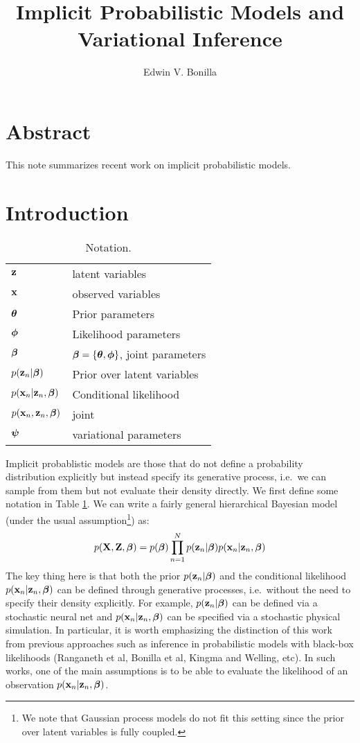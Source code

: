 \documentclass[12pt,a4page]{article}
\title{Implicit Probabilistic Models and Variational Inference}
\author{Edwin V. Bonilla}
\begin{document}
	\maketitle
	\section*{Abstract}
	This note summarizes recent work on implicit probabilistic models. 
	\section{Introduction} 
	\begin{table}[h!]
		\centering
		\caption{Notation. }
		\label{tab-notation}
		\begin{tabular}{ll}
			\toprule
			$\mathbf{z}$ & latent variables\\
			$\mathbf{x}$ & observed variables \\
			$\boldsymbol{ \theta }$ & Prior parameters\\
			$\boldsymbol{ \phi }$ & Likelihood parameters \\
			$\boldsymbol{ \beta }$ & $\boldsymbol{ \beta } = \{ \boldsymbol{ \theta }, \boldsymbol{ \phi }\}$, joint parameters\\
			$p (\mathbf{z}_{n} | \boldsymbol{ \beta })$ & Prior over latent variables \\
			$p(\mathbf{x}_{n} | \mathbf{z}_{n}, \boldsymbol{ \beta })$ & Conditional likelihood \\
			$p(\mathbf{x}_{n}, \mathbf{z}_{n}, \boldsymbol{ \beta })$ & joint \\
			$\boldsymbol{ \psi }$ & variational parameters\\
			\bottomrule 
		\end{tabular}
	\end{table}
		Implicit probablistic models are those that do not define a probability distribution explicitly but instead specify its generative process, i.e.~we can sample from them but not evaluate their density directly. We first define some notation in Table \ref{tab-notation}.
	We can write a fairly general hierarchical Bayesian model (under the usual \iid assumption\footnote{We note that Gaussian process models do not fit this setting since the prior over latent variables is fully coupled. }) as:
	\begin{equation}
		p(\mathbf{X}, \mathbf{Z}, \boldsymbol{ \beta }){} = p(\boldsymbol{ \beta }) \prod_{n=1}^{N} p (\mathbf{z}_{n} | \boldsymbol{ \beta }) p(\mathbf{x}_{n} | \mathbf{z}_{n}, \boldsymbol{ \beta })
	\end{equation}
	The key thing here is that both the prior  $p (\mathbf{z}_{n} | \boldsymbol{ \beta })$ and the conditional likelihood $p(\mathbf{x}_{n} | \mathbf{z}_{n}, \boldsymbol{ \beta })$ can be defined through  generative processes, i.e.~without the need to specify their density explicitly. For example,  $p (\mathbf{z}_{n} | \boldsymbol{ \beta })$ can be defined via a stochastic neural net and $p(\mathbf{x}_{n} | \mathbf{z}_{n}, \boldsymbol{ \beta })$ can be specified via a stochastic physical simulation. In particular, it is worth emphasizing the distinction of this work from previous approaches such as inference in probabilistic models with black-box likelihoods (Ranganeth et al, Bonilla et al, Kingma and Welling, etc). In such works, one of the main assumptions is to be able to evaluate the likelihood of an observation $p(\mathbf{x}_{n} | \mathbf{z}_{n}, \boldsymbol{ \beta })$. 
	
\end{document}

